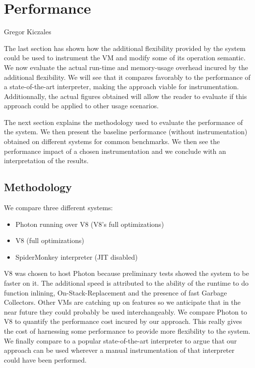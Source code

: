 \chapter{Performance}
{Gregor Kiczales~\cite{Kiczales92towardsa}}

\label{chap:Performance}

The last section has shown how the additional flexibility provided by the
system could be used to instrument the VM and modify some of its operation
semantic. We now evaluate the actual run-time and memory-usage overhead incured
by the additional flexibility. We will see that it compares favorably to the
performance of a state-of-the-art interpreter, making the approach viable for
instrumentation. Additionnally, the actual figures obtained will allow the
reader to evaluate if this approach could be applied to other usage scenarios.

The next section explains the methodology used to evaluate the performance of
the system. We then present the baseline performance (without instrumentation)
obtained on different systems for common benchmarks. We then see the
performance impact of a chosen instrumentation and we conclude with an
interpretation of the results. 


\section{Methodology}

We compare three different systems:
\begin{itemize}
    \item Photon running over V8 (V8's full optimizations)
    \item V8 (full optimizations)
    \item SpiderMonkey interpreter (JIT disabled)
\end{itemize}

V8 was chosen to host Photon because preliminary tests showed the system to be
faster on it. The additional speed is attributed to the ability of the runtime
to do function inlining, On-Stack-Replacement and the presence of fast Garbage
Collectors. Other VMs are catching up on features so we anticipate that in the
near future they could probably be used interchangeably. We compare Photon to
V8 to quantify the performance cost incured by our approach. This really gives
the cost of harnessing some performance to provide more flexibility to the
system.  We finally compare to a popular state-of-the-art interpreter to argue
that our approach can be used wherever a manual instrumentation of that
interpreter could have been performed. 


